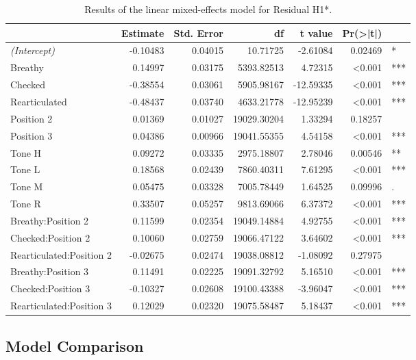 \documentclass[12pt, letterpaper]{article}
\providecommand{\lsptoprule}{\midrule\toprule}
\providecommand{\lspbottomrule}{\bottomrule\midrule}
\begin{document}
\begin{table}[!h]
  \centering
  \caption{Results of the linear mixed-effects model for Residual H1*.}
  \label{tab:ResH1Results}
  \begin{tabular}{lrrrrrl}
    \lsptoprule
    & Estimate & Std. Error & df & t value & Pr(>|t|) & \\ \hline 
    \textit{(Intercept)} & -0.10483 & 0.04015 & 10.71725 & -2.61084 & 0.02469 & *\\
    Breathy & 0.14997 & 0.03175 & 5393.82513 & 4.72315 & \textless 0.001 & ***\\
    Checked & -0.38554 & 0.03061 & 5905.98167 & -12.59335 & \textless 0.001 & ***\\
    Rearticulated & -0.48437 & 0.03740 & 4633.21778 & -12.95239 & \textless 0.001 & ***\\
    Position 2 & 0.01369 & 0.01027 & 19029.30204 & 1.33294 & 0.18257 & \\
    Position 3 & 0.04386 & 0.00966 & 19041.55355 & 4.54158 & \textless 0.001 & ***\\
    Tone H & 0.09272 & 0.03335 & 2975.18807 & 2.78046 & 0.00546 & **\\
    Tone L & 0.18568 & 0.02439 & 7860.40311 & 7.61295 & \textless 0.001 & ***\\
    Tone M & 0.05475 & 0.03328 & 7005.78449 & 1.64525 & 0.09996 & .\\
    Tone R & 0.33507 & 0.05257 & 9813.69066 & 6.37372 & \textless 0.001 & ***\\
    Breathy:Position 2 & 0.11599 & 0.02354 & 19049.14884 & 4.92755 & \textless 0.001 & ***\\
    Checked:Position 2 & 0.10060 & 0.02759 & 19066.47122 & 3.64602 & \textless 0.001 & ***\\
    Rearticulated:Position 2 & -0.02675 & 0.02474 & 19038.08812 & -1.08092 & 0.27975 & \\
    Breathy:Position 3 & 0.11491 & 0.02225 & 19091.32792 & 5.16510 & \textless 0.001 & ***\\
    Checked:Position 3 & -0.10327 & 0.02608 & 19100.43388 & -3.96047 & \textless 0.001 & ***\\
    Rearticulated:Position 3 & 0.12029 & 0.02320 & 19075.58487 & 5.18437 & \textless 0.001 & ***\\
    \lspbottomrule
  \end{tabular}
\end{table}

\subsection{Model Comparison} \label{sec:Comparison}
\end{document}
